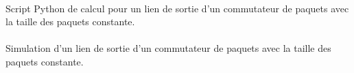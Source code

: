         \paragraph{}
Script Python de calcul pour un lien de sortie d'un commutateur de paquets avec la taille des paquets constante.

    \clearpage{}
%
        \paragraph{}
Simulation d'un lien de sortie d'un commutateur de paquets avec la taille des paquets constante.

    \clearpage
%
